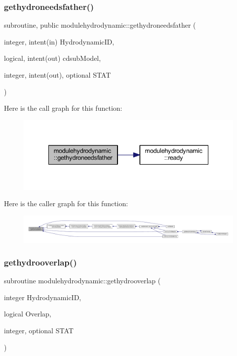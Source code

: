 \subsubsection{\texorpdfstring{gethydroneedsfather()}{gethydroneedsfather()}}
{\footnotesize\ttfamily subroutine, public modulehydrodynamic\+::gethydroneedsfather (\begin{DoxyParamCaption}\item[{integer, intent(in)}]{Hydrodynamic\+ID,  }\item[{logical, intent(out)}]{cdsub\+Model,  }\item[{integer, intent(out), optional}]{S\+T\+AT }\end{DoxyParamCaption})}

Here is the call graph for this function\+:\nopagebreak
\begin{figure}[H]
\begin{center}
\leavevmode
\includegraphics[width=335pt]{namespacemodulehydrodynamic_a391b4f9e43b2d5d986bedc666b00da4d_cgraph}
\end{center}
\end{figure}
Here is the caller graph for this function\+:\nopagebreak
\begin{figure}[H]
\begin{center}
\leavevmode
\includegraphics[width=350pt]{namespacemodulehydrodynamic_a391b4f9e43b2d5d986bedc666b00da4d_icgraph}
\end{center}
\end{figure}
\mbox{\label{namespacemodulehydrodynamic_aaf559665e8122ee5d3cf650f45ac04fd}} 
\subsubsection{\texorpdfstring{gethydrooverlap()}{gethydrooverlap()}}
{\footnotesize\ttfamily subroutine modulehydrodynamic\+::gethydrooverlap (\begin{DoxyParamCaption}\item[{integer}]{Hydrodynamic\+ID,  }\item[{logical}]{Overlap,  }\item[{integer, optional}]{S\+T\+AT }\end{DoxyParamCaption})\hspace{0.3cm}{\ttfamily [private]}}

